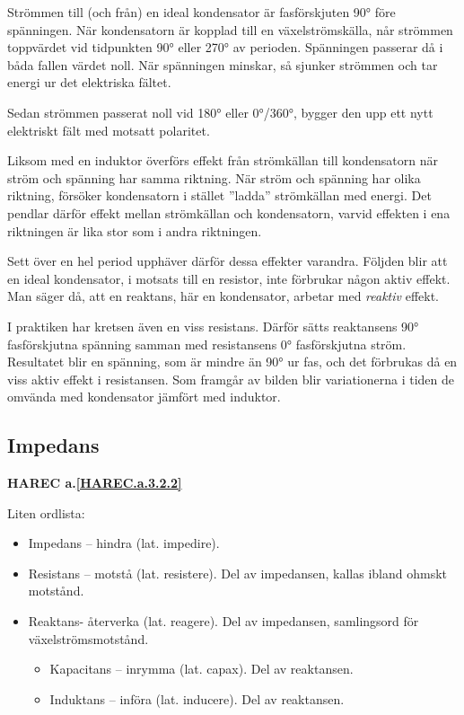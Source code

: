 Strömmen till (och från) en ideal kondensator är fasförskjuten 90° före
spänningen. När kondensatorn är kopplad till en växelströmskälla, når strömmen
toppvärdet vid tidpunkten 90° eller 270° av perioden. Spänningen passerar då i
båda fallen värdet noll. När spänningen minskar, så sjunker strömmen och tar
energi ur det elektriska fältet.

Sedan strömmen passerat noll vid 180° eller 0°/360°, bygger den upp ett nytt
elektriskt fält med motsatt polaritet.

Liksom med en induktor överförs effekt från strömkällan till kondensatorn när
ström och spänning har samma riktning. När ström och spänning har olika
riktning, försöker kondensatorn i stället ''ladda'' strömkällan med energi. Det
pendlar därför effekt mellan strömkällan och kondensatorn, varvid effekten i
ena riktningen är lika stor som i andra riktningen.

Sett över en hel period upphäver därför dessa effekter varandra. Följden blir
att en ideal kondensator, i motsats till en resistor, inte förbrukar någon
aktiv effekt. Man säger då, att en reaktans, här en kondensator, arbetar med
\emph{reaktiv} effekt.

I praktiken har kretsen även en viss resistans. Därför sätts reaktansens 90°
fasförskjutna spänning samman med resistansens 0° fasförskjutna ström.
Resultatet blir en spänning, som är mindre än 90° ur fas, och det förbrukas då
en viss aktiv effekt i resistansen. Som framgår av bilden blir variationerna i
tiden de omvända med kondensator jämfört med induktor.

\subsection{Impedans}
\textbf{HAREC a.\ref{HAREC.a.3.2.2}\label{myHAREC.a.3.2.2}}

Liten ordlista:
\begin{itemize}
\item Impedans -- hindra (lat. impedire).
\item Resistans -- motstå (lat. resistere).
  Del av impedansen, kallas ibland ohmskt motstånd.
\item Reaktans- återverka (lat. reagere).
  Del av impedansen, samlingsord för växelströmsmotstånd.
  \begin{itemize}
  \item Kapacitans -- inrymma (lat. capax). Del av reaktansen.
  \item Induktans -- införa (lat. inducere). Del av reaktansen.
  \end{itemize}
\end{itemize}

